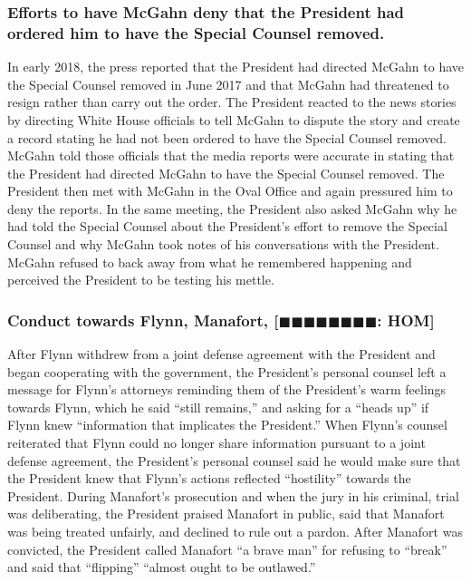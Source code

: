 \subsubsection*{Efforts to have McGahn deny that the President had ordered him to have the Special Counsel removed.}

In early 2018, the press reported that the President had directed McGahn to have the Special Counsel removed in June 2017 and that McGahn had threatened to resign rather than carry out the order.
The President reacted to the news stories by directing White House officials to tell McGahn to dispute the story and create a record stating he had not been ordered to have the Special Counsel removed.
McGahn told those officials that the media reports were accurate in stating that the President had directed McGahn to have the Special Counsel removed.
The President then met with McGahn in the Oval Office and again pressured him to deny the reports.
In the same meeting, the President also asked McGahn why he had told the Special Counsel about the President’s effort to remove the Special Counsel and why McGahn took notes of his conversations with the President.
McGahn refused to back away from what he remembered happening and perceived the President to be testing his mettle.

\subsubsection*{Conduct towards Flynn, Manafort, [$\blacksquare\blacksquare\blacksquare\blacksquare\blacksquare\blacksquare\blacksquare\blacksquare$: HOM]}

After Flynn withdrew from a joint defense agreement with the President and began cooperating with the government, the President’s personal counsel left a message for Flynn’s attorneys reminding them of the President’s warm feelings towards Flynn, which he said “still remains,” and asking for a “heads up” if Flynn knew “information that implicates the President.”
When Flynn’s counsel reiterated that Flynn could no longer share information pursuant to a joint defense agreement, the President’s personal counsel said he would make sure that the President knew that Flynn’s actions reflected “hostility” towards the President.
During Manafort’s prosecution and when the jury in his criminal, trial was deliberating, the President praised Manafort in public, said that Manafort was being treated unfairly, and declined to rule out a pardon.
After Manafort was convicted, the President called Manafort “a brave man” for refusing to “break” and said that “flipping” “almost ought to be outlawed.”

